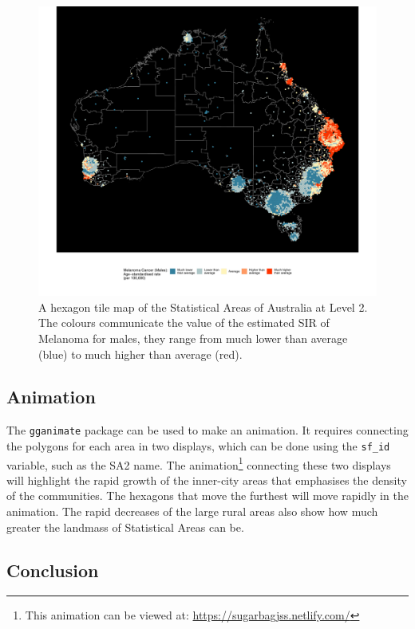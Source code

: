 \begin{figure}[h]
\centering
\includegraphics[width=14cm]{figs/aus_gghexmap.pdf}
\caption{\label{fig:melanoma-geo}A hexagon tile map of the Statistical Areas of Australia at Level 2. The colours communicate the value of the estimated SIR of Melanoma for males, they range from much lower than average (blue) to much higher than average (red).}
\end{figure}

\hypertarget{animation}{%
\subsection{Animation}\label{animation}}

The \texttt{gganimate} \citep{gganimate} package can be used to make an
animation. It requires connecting the polygons for each area in two
displays, which can be done using the \texttt{sf\_id} variable, such as
the SA2 name. The animation\footnote{This animation can be viewed at:
  \url{https://sugarbagjss.netlify.com/}} connecting these two displays
will highlight the rapid growth of the inner-city areas that emphasises
the density of the communities. The hexagons that move the furthest will
move rapidly in the animation. The rapid decreases of the large rural
areas also show how much greater the landmass of Statistical Areas can
be.

\hypertarget{conclusion-03}{%
\subsection{Conclusion}\label{conclusion-03}}

